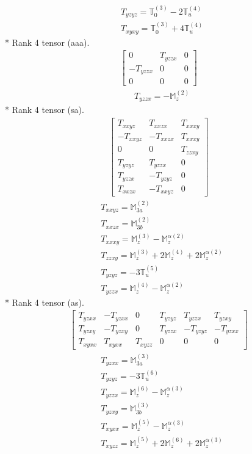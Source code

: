 \documentclass[fleqn,8pt,landscape]{jsarticle}
\begin{document}
\begin{align*}
& T_{yzyz} = \mathbb{T}_{0}^{(3)} - 2 \mathbb{T}_{u}^{(4)} \\
& T_{xyxy} = \mathbb{T}_{0}^{(3)} + 4 \mathbb{T}_{u}^{(4)}
\end{align*}
* Rank 4 tensor (aaa).
\begin{align*}
\begin{bmatrix} 0 & T_{yzzx} & 0 \\ - T_{yzzx} & 0 & 0 \\ 0 & 0 & 0 \end{bmatrix}
\end{align*}
\begin{align*}
& T_{yzzx} = - \mathbb{M}_{z}^{(2)}
\end{align*}
* Rank 4 tensor (sa).
\begin{align*}
\begin{bmatrix} T_{xxyz} & T_{xxzx} & T_{xxxy} \\ - T_{xxyz} & - T_{xxzx} & T_{xxxy} \\ 0 & 0 & T_{zzxy} \\ T_{yzyz} & T_{yzzx} & 0 \\ T_{yzzx} & - T_{yzyz} & 0 \\ T_{xxzx} & - T_{xxyz} & 0 \end{bmatrix}
\end{align*}
\begin{align*}
& T_{xxyz} = \mathbb{M}_{3a}^{(2)} \\
& T_{xxzx} = \mathbb{M}_{3b}^{(2)} \\
& T_{xxxy} = \mathbb{M}_{z}^{(3)} - \mathbb{M}_{z}^{\alpha(2)} \\
& T_{zzxy} = \mathbb{M}_{z}^{(3)} + 2 \mathbb{M}_{z}^{(4)} + 2 \mathbb{M}_{z}^{\alpha(2)} \\
& T_{yzyz} = - 3 \mathbb{T}_{u}^{(5)} \\
& T_{yzzx} = \mathbb{M}_{z}^{(4)} - \mathbb{M}_{z}^{\alpha(2)}
\end{align*}
* Rank 4 tensor (as).
\begin{align*}
\begin{bmatrix} T_{yzxx} & - T_{yzxx} & 0 & T_{yzyz} & T_{yzzx} & T_{yzxy} \\ T_{yzxy} & - T_{yzxy} & 0 & T_{yzzx} & - T_{yzyz} & - T_{yzxx} \\ T_{xyxx} & T_{xyxx} & T_{xyzz} & 0 & 0 & 0 \end{bmatrix}
\end{align*}
\begin{align*}
& T_{yzxx} = \mathbb{M}_{3a}^{(3)} \\
& T_{yzyz} = - 3 \mathbb{T}_{u}^{(6)} \\
& T_{yzzx} = \mathbb{M}_{z}^{(6)} - \mathbb{M}_{z}^{\alpha(3)} \\
& T_{yzxy} = \mathbb{M}_{3b}^{(3)} \\
& T_{xyxx} = \mathbb{M}_{z}^{(5)} - \mathbb{M}_{z}^{\alpha(3)} \\
& T_{xyzz} = \mathbb{M}_{z}^{(5)} + 2 \mathbb{M}_{z}^{(6)} + 2 \mathbb{M}_{z}^{\alpha(3)}
\end{align*}
\end{document}
